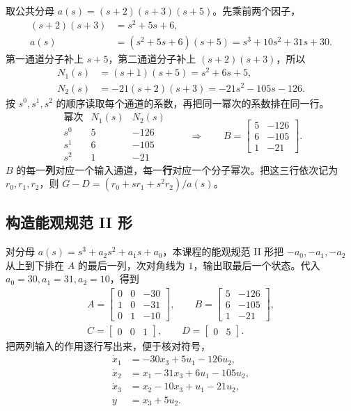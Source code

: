 取公共分母 $a(s)=(s+2)(s+3)(s+5)$。先乘前两个因子，
\[
\begin{aligned}
    (s+2)(s+3)&=s^2+5s+6,\\
    a(s)&=(s^2+5s+6)(s+5)=s^3+10s^2+31s+30.
\end{aligned}
\]
第一通道分子补上 $s+5$，第二通道分子补上 $(s+2)(s+3)$，所以
\[
\begin{aligned}
    N_1(s)&=(s+1)(s+5)=s^2+6s+5,\\
    N_2(s)&=-21(s+2)(s+3)=-21s^2-105s-126 .
\end{aligned}
\]
按 $s^0,s^1,s^2$ 的顺序读取每个通道的系数，再把同一幂次的系数排在同一行。
\[
\begin{array}{c|rr}
    \text{幂次}&N_1(s)&N_2(s)\\ \hline
    s^0&5&-126\\
    s^1&6&-105\\
    s^2&1&-21
\end{array}
\qquad\Longrightarrow\qquad
    B=\begin{bmatrix}5&-126\\6&-105\\1&-21\end{bmatrix}.
\]
$B$ 的每一\textbf{列}对应一个输入通道，每一\textbf{行}对应一个分子幂次。把这三行依次记为 $r_0,r_1,r_2$，则 $G-D=(r_0+sr_1+s^2r_2)/a(s)$。

\subsection{构造能观规范 II 形}

对分母 $a(s)=s^3+a_2s^2+a_1s+a_0$，本课程的能观规范 II 形把 $-a_0,-a_1,-a_2$ 从上到下排在 $A$ 的最后一列，次对角线为 $1$，输出取最后一个状态。代入 $a_0=30,a_1=31,a_2=10$，得到
\[
 \begin{gathered}
    A=\begin{bmatrix}0&0&-30\\1&0&-31\\0&1&-10\end{bmatrix},\qquad
    B=\begin{bmatrix}5&-126\\6&-105\\1&-21\end{bmatrix},\\[-1pt]
    C=\begin{bmatrix}0&0&1\end{bmatrix},\qquad
    D=\begin{bmatrix}0&5\end{bmatrix}.
 \end{gathered}
\]
把两列输入的作用逐行写出来，便于核对符号，
\[
\boxed{\begin{aligned}
    \dot x_1&=-30x_3+5u_1-126u_2,\\
    \dot x_2&=x_1-31x_3+6u_1-105u_2,\\
    \dot x_3&=x_2-10x_3+u_1-21u_2,\\
    y&=x_3+5u_2 .
\end{aligned}}
\]

